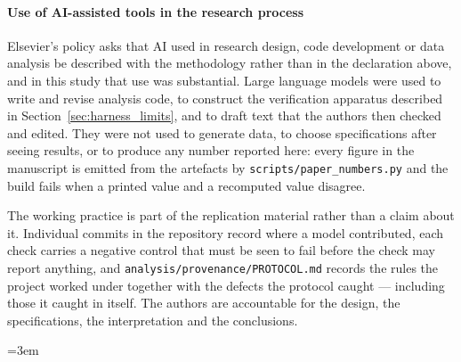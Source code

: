 \documentclass[preprint,11pt,authoryear]{elsarticle}
\newcommand{\1}{\boldsymbol{1}}
\begin{document}
	\paragraph*{Use of AI-assisted tools in the research process}
	Elsevier's policy asks that AI used in research design, code development or data analysis be described with the methodology rather than in the declaration above, and in this study that use was substantial. Large language models were used to write and revise analysis code, to construct the verification apparatus described in Section~\ref{sec:harness_limits}, and to draft text that the authors then checked and edited. They were not used to generate data, to choose specifications after seeing results, or to produce any number reported here: every figure in the manuscript is emitted from the artefacts by \texttt{scripts/paper\_numbers.py} and the build fails when a printed value and a recomputed value disagree.

	The working practice is part of the replication material rather than a claim about it. Individual commits in the repository record where a model contributed, each check carries a negative control that must be seen to fail before the check may report anything, and \texttt{analysis/provenance/PROTOCOL.md} records the rules the project worked under together with the defects the protocol caught --- including those it caught in itself. The authors are accountable for the design, the specifications, the interpretation and the conclusions.

\sloppy\emergencystretch=3em
	
	
	
	
\newpage
\end{document}
